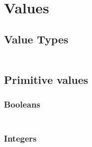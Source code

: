 \section*{Values}\hypertarget{values}{}\label{values}

\subsection*{Value Types}\hypertarget{value-types}{}\label{value-types}

\begin{align*}
  [ ~ 
  \KEY{Type} ~ & \NAMEHYPER{../../../../../Funcons-beta/Values}{Value-Types}{value-types} \\
  \KEY{Alias} ~ & \NAMEHYPER{../../../../../Funcons-beta/Values}{Value-Types}{types}
  ~ ]
\end{align*}
\subsection*{Primitive values}\hypertarget{primitive-values}{}\label{primitive-values}

\subsubsection*{Booleans}\hypertarget{booleans}{}\label{booleans}

\begin{align*}
  [ ~ 
  \KEY{Datatype} ~ & \NAMEHYPER{../../../../../Funcons-beta/Values/Primitive}{Booleans}{booleans} \\
  \KEY{Alias} ~ & \NAMEHYPER{../../../../../Funcons-beta/Values/Primitive}{Booleans}{bools} \\
  \KEY{Funcon} ~ & \NAMEHYPER{../../../../../Funcons-beta/Values/Primitive}{Booleans}{true} \\
  \KEY{Funcon} ~ & \NAMEHYPER{../../../../../Funcons-beta/Values/Primitive}{Booleans}{false} \\
  \KEY{Funcon} ~ & \NAMEHYPER{../../../../../Funcons-beta/Values/Primitive}{Booleans}{not}
  ~ ]
\end{align*}
\subsubsection*{Integers}\hypertarget{integers}{}\label{integers}

